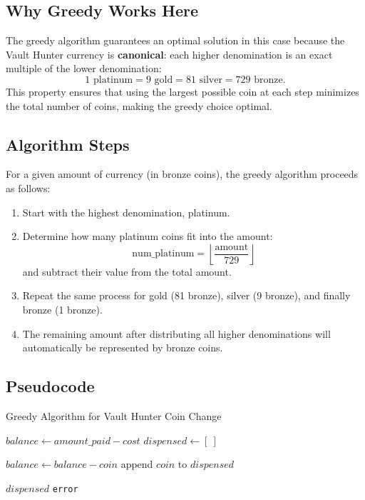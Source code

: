 \documentclass[12pt,a4paper]{report}
\begin{document}
\subsection{Why Greedy Works Here}

The greedy algorithm guarantees an optimal solution in this case because the Vault Hunter currency is \textbf{canonical}: each higher denomination is an exact multiple of the lower denomination:
\[
1 \text{ platinum} = 9 \text{ gold} = 81 \text{ silver} = 729 \text{ bronze}.
\]
This property ensures that using the largest possible coin at each step minimizes the total number of coins, making the greedy choice optimal.

\subsection{Algorithm Steps}

For a given amount of currency (in bronze coins), the greedy algorithm proceeds as follows:

\begin{enumerate}
    \item Start with the highest denomination, platinum.
    \item Determine how many platinum coins fit into the amount:
    \[
    \text{num\_platinum} = \left\lfloor \frac{\text{amount}}{729} \right\rfloor
    \]
    and subtract their value from the total amount.
    \item Repeat the same process for gold (81 bronze), silver (9 bronze), and finally bronze (1 bronze).
    \item The remaining amount after distributing all higher denominations will automatically be represented by bronze coins.
\end{enumerate}

\subsection{Pseudocode}
\begin{algorithm}
\caption{Greedy Algorithm for Vault Hunter Coin Change}
\begin{algorithmic}[1]
    \State {}
    \State $balance \gets amount\_paid - cost$
    \State $dispensed \gets [\ ]$ 
    
            \State $balance \gets balance - coin$ 
            \State append $coin$ to $dispensed$ 
        \EndWhile
    \EndFor
    
        \State \Return $dispensed$ 
    \Else
        \State \Return \texttt{error} 
    \EndIf
\EndProcedure
\end{algorithmic}
\end{algorithm}
\end{document}
